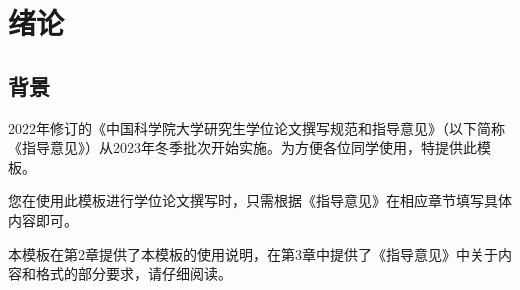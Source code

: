 
\chapter{绪论}\label{chap:introduction}

\section{背景}

2022年修订的《中国科学院大学研究生学位论文撰写规范和指导意见》（以下简称《指导意见》）从2023年冬季批次开始实施。为方便各位同学使用，特提供此模板。

您在使用此模板进行学位论文撰写时，只需根据《指导意见》在相应章节填写具体内容即可。

本模板在第2章提供了本模板的使用说明，在第3章中提供了《指导意见》中关于内容和格式的部分要求，请仔细阅读。


